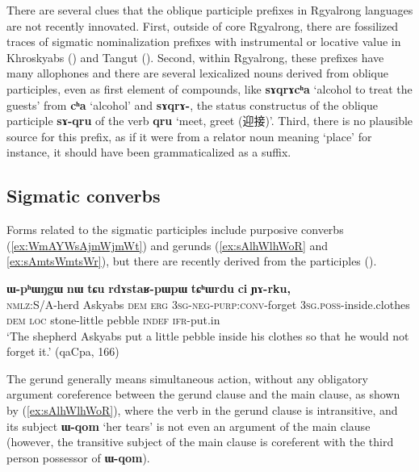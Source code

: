\documentclass[oneside,a4paper,11pt]{article}
\newcommand{\ipa}[1]{\textbf{{\phon\mbox{#1}}}} %
\newcommand{\zh}[1]{{\cn #1}}
\begin{document}
There are several clues that the oblique participle prefixes in Rgyalrong languages are not recently innovated. First, outside of core Rgyalrong, there are fossilized traces of sigmatic nominalization prefixes with instrumental or locative value in Khroskyabs (\citealt[511]{lai17khroskyabs}) and Tangut (\citealt[256-257]{jacques14esquisse}). Second, within Rgyalrong, these prefixes have many allophones and there are several lexicalized nouns derived from oblique participles, even as first element of compounds, like \ipa{sɤqrɤcʰa} `alcohol to treat the guests' from \ipa{cʰa} `alcohol' and \ipa{sɤqrɤ-}, the status constructus of the oblique participle \ipa{sɤ-qru} of the verb \ipa{qru} `meet, greet (\zh{迎接})'. Third, there is no plausible source for this prefix, as if it were from a relator noun meaning `place' for instance, it should have been grammaticalized as a suffix.

\subsection{Sigmatic converbs} \label{sec:s.converbs}

Forms related to the sigmatic participles include purposive  converbs (\ref{ex:WmAYWsAjmWjmWt})  and gerunds (\ref{ex:sAlhWlhWoR} and \ref{ex:sAmtsWmtsWr}), but there are recently derived from the participles (\citealt[272-273]{jacques14linking}).

\begin{exe}
\ex \label{ex:WmAYWsAjmWjmWt}
\gll
[\ipa{kɯ-lɤɣ}   	\ipa{acɤβ}   	\ipa{nɯ}   	\ipa{kɯ}   	\ipa{\textbf{ɯ-mɤ-sɤ-jmɯ\textasciitilde{}jmɯt}},]   	\ipa{ɯ-pʰɯŋgɯ}   	\ipa{nɯ}   	\ipa{tɕu}   	\ipa{rdɤstaʁ-pɯpɯ}   	\ipa{tɕʰɯrdu}   	\ipa{ci}  \ipa{ɲɤ-rku,}\\
 \textsc{nmlz}:S/A-herd Askyabs \textsc{dem} \textsc{erg}  \textsc{3sg-neg-purp:conv}-forget \textsc{3sg.poss}-inside.clothes \textsc{dem} \textsc{loc} stone-little pebble \textsc{indef}
 \textsc{ifr}-put.in\\
\glt `The shepherd Askyabs put a little pebble inside his clothes so that he would not forget it.' (qaCpa, 166)
\end{exe}

The gerund generally means simultaneous action, without any obligatory argument coreference between the gerund clause and the main clause, as shown by (\ref{ex:sAlhWlhWoR}), where the verb in the gerund clause is intransitive, and its subject \ipa{ɯ-qom} `her tears' is not even an argument of the main clause (however, the transitive subject of the main clause is coreferent with the third person possessor of \ipa{ɯ-qom}).  
\end{document}
